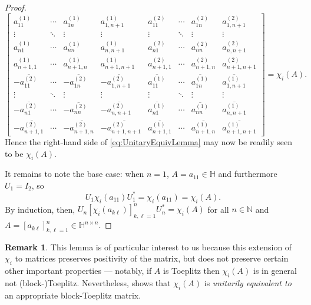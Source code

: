 \documentclass[11pt,reqno]{amsart}
\def\x{\chi}
\def\NN{\mathbb{N}}
\def\HH{\mathbb{H}}
\theoremstyle{definition}
\newtheorem{remark}[theorem]{Remark}
\numberwithin{equation}{section}
\begin{document}
\begin{proof}
\[        \begin{bmatrix} a_{11}^{(1)} & \cdots & a_{1n}^{(1)} & a_{1,n+1}^{(1)} &  a_{11}^{(2)} & \cdots & a_{1n}^{(2)} & a_{1,n+1}^{(2)} \\[6pt] \vdots & \ddots & \vdots & \vdots & \vdots & \ddots & \vdots & \vdots \\[6pt] a_{n1}^{(1)} & \cdots & a_{nn}^{(1)} & a_{n,n+1}^{(1)} & a_{n1}^{(2)} & \cdots & a_{nn}^{(2)} & a_{n,n+1}^{(2)} \\[6pt] a_{n+1,1}^{(1)} & \cdots & a_{n+1,n}^{(1)} & a_{n+1,n+1}^{(1)} & a_{n+1,1}^{(2)} & \cdots & a_{n+1,n}^{(2)} & a_{n+1,n+1}^{(2)} \\[6pt] -\overline{a_{11}^{(2)}} & \cdots & -\overline{a_{1n}^{(2)}} & -\overline{a_{1,n+1}^{(2)}} & \overline{a_{11}^{(1)}} & \cdots & \overline{a_{1n}^{(1)}} & \overline{a_{1,n+1}^{(1)}} \\[6pt] \vdots & \ddots & \vdots & \vdots & \vdots & \ddots & \vdots & \vdots \\[6pt] -\overline{a_{n1}^{(2)}} & \cdots & -\overline{a_{nn}^{(2)}} & -\overline{a_{n,n+1}^{(2)}} & \overline{a_{n1}^{(1)}} & \cdots & \overline{a_{nn}^{(1)}} & \overline{a_{n,n+1}^{(1)}} \\[6pt] -\overline{a_{n+1,1}^{(2)}} & \cdots & -\overline{a_{n+1,n}^{(2)}} & -\overline{a_{n+1,n+1}^{(2)}} & \overline{a_{n+1,1}^{(1)}} & \cdots & \overline{a_{n+1,n}^{(1)}} & \overline{a_{n+1,n+1}^{(1)}} \end{bmatrix} = \x_i(A).
    \]
    Hence the right-hand side of \eqref{eq:UnitaryEquivLemma} may now be readily seen to be \(\x_i(A)\).

    It remains to note the base case: when \(n=1\), \(A = a_{11} \in \HH\) and furthermore \(U_1 = I_2\), so
    \[
        U_1 \x_i(a_{11}) U_1^* = \x_i(a_{11}) = \x_i(A).
    \]
    By induction, then, \(U_n [\x_i(a_{k\ell})]_{k,\ell=1}^n U_n^* = \x_i(A)\) for all \(n \in \NN\) and \(A = [a_{k\ell}]_{k,\ell=1}^n \in \HH^{n\times n}\).
\end{proof}

\begin{remark}
	This lemma is of particular interest to us because this extension of \(\x_i\) to matrices preserves positivity of the matrix, but does not preserve certain other important properties --- notably, if \(A\) is Toeplitz then \(\x_i(A)\) is in general not (block-)Toeplitz. Nevertheless,  shows that \(\x_i(A)\) is \emph{unitarily equivalent to} an appropriate block-Toeplitz matrix.
\end{remark}
\end{document}
